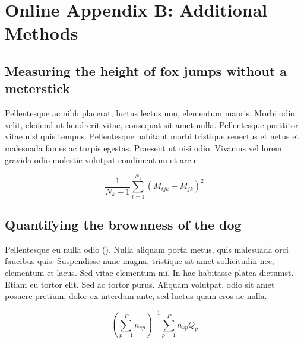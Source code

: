 \documentclass[11pt]{article}
\begin{document}
\newpage{}

\section*{Online Appendix B: Additional Methods}

\renewcommand{\theequation}{B\arabic{equation}}
\setcounter{equation}{0}  %
\renewcommand{\thetable}{B\arabic{table}}
\setcounter{figure}{0}
\setcounter{table}{0}

\subsection*{Measuring the height of fox jumps without a meterstick}

Pellentesque ac nibh placerat, luctus lectus non, elementum mauris. 
Morbi odio velit, eleifend ut hendrerit vitae, consequat sit amet 
nulla. Pellentesque porttitor vitae nisl quis tempus. Pellentesque 
habitant morbi tristique senectus et netus et malesuada fames ac 
turpis egestas. Praesent ut nisi odio. Vivamus vel lorem gravida 
odio molestie volutpat condimentum et arcu. 

\begin{equation}
{ \frac{1}{N_k-1} \sum \limits_{t=1}^{N_k} (M_{tjk} - \bar{M}_{jk})^2}
\end{equation}

\subsection*{Quantifying the brownness of the dog}

Pellentesque eu nulla odio (\citealt{Xiao2015,CookEtAl2015}). Nulla 
aliquam porta metus, quis malesuada orci faucibus quis. Suspendisse nunc 
magna, tristique sit amet sollicitudin nec, elementum et lacus. Sed 
vitae elementum mi. In hac habitasse platea dictumst. Etiam eu tortor 
elit. Sed ac tortor purus. Aliquam volutpat, odio sit amet posuere 
pretium, dolor ex interdum ante, sed luctus quam eros ac nulla. 

\begin{equation}
{ (\sum \limits_{p=1}^P {n_{sp}})^{-1}\sum \limits_{p=1}^P {n_{sp}Q_{p}}}
\end{equation}

\newpage{}

\end{document}
